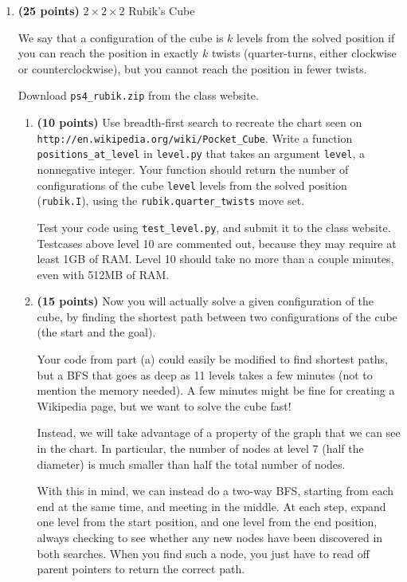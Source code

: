 \documentclass[12pt,twoside]{article}
\begin{document}
\begin{enumerate}
\begin{enumerate}
  \end{enumerate}

\item {\bf (25 points)} $2 \times 2 \times 2$ Rubik's Cube

  We say that a configuration of the cube is $k$ levels from the
  solved position if you can reach the position in exactly $k$ twists
  (quarter-turns, either clockwise or counterclockwise), but you
  cannot reach the position in fewer twists.

  Download \texttt{ps4\_rubik.zip} from the class website.

  \begin{enumerate}

  \item {\bf (10 points)} Use breadth-first search to recreate the
    chart seen on \\
    \texttt{http://en.wikipedia.org/wiki/Pocket\_Cube}.  Write a
    function \\ \texttt{positions\_at\_level} in \texttt{level.py}
    that takes an argument \texttt{level}, a nonnegative integer.
    Your function should return the number of configurations of the
    cube \texttt{level} levels from the solved position
    (\texttt{rubik.I}), using the \texttt{rubik.quarter\_twists} move
    set.

    Test your code using \texttt{test\_level.py}, and submit it to the
    class website. Testcases above level 10 are commented out, because
    they may require at least 1GB of RAM. Level 10 should take no more
    than a couple minutes, even with 512MB of RAM.


  \item {\bf (15 points)} Now you will actually solve a given configuration
    of the cube, by finding the shortest path between two configurations
    of the cube (the start and the goal).

    Your code from part (a) could easily be modified to find shortest
    paths, but a BFS that goes as deep as 11 levels takes a few minutes
    (not to mention the memory needed). A few minutes might be fine
    for creating a Wikipedia page, but we want to solve the cube fast!

    Instead, we will take advantage of a property of the graph that we
    can see in the chart. In particular, the number of nodes at level
    7 (half the diameter) is much smaller than half the total number
    of nodes. 
    
    With this in mind, we can instead do a two-way BFS, starting from
    each end at the same time, and meeting in the middle. At each
    step, expand one level from the start position, and one level from
    the end position, always checking to see whether any new nodes have
    been discovered in both searches. When you find such a node,
    you just have to read off parent pointers to return the correct path. 


\end{enumerate}
\end{enumerate}
\end{document}
